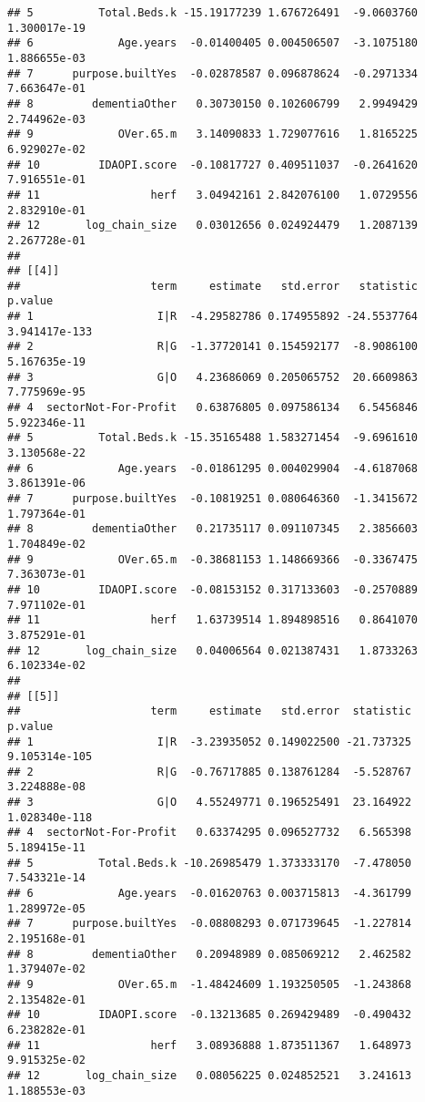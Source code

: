 \documentclass[]{article}
\begin{document}
\begin{verbatim}
## 5          Total.Beds.k -15.19177239 1.676726491  -9.0603760  1.300017e-19
## 6             Age.years  -0.01400405 0.004506507  -3.1075180  1.886655e-03
## 7      purpose.builtYes  -0.02878587 0.096878624  -0.2971334  7.663647e-01
## 8         dementiaOther   0.30730150 0.102606799   2.9949429  2.744962e-03
## 9             OVer.65.m   3.14090833 1.729077616   1.8165225  6.929027e-02
## 10         IDAOPI.score  -0.10817727 0.409511037  -0.2641620  7.916551e-01
## 11                 herf   3.04942161 2.842076100   1.0729556  2.832910e-01
## 12       log_chain_size   0.03012656 0.024924479   1.2087139  2.267728e-01
## 
## [[4]]
##                    term     estimate   std.error   statistic       p.value
## 1                   I|R  -4.29582786 0.174955892 -24.5537764 3.941417e-133
## 2                   R|G  -1.37720141 0.154592177  -8.9086100  5.167635e-19
## 3                   G|O   4.23686069 0.205065752  20.6609863  7.775969e-95
## 4  sectorNot-For-Profit   0.63876805 0.097586134   6.5456846  5.922346e-11
## 5          Total.Beds.k -15.35165488 1.583271454  -9.6961610  3.130568e-22
## 6             Age.years  -0.01861295 0.004029904  -4.6187068  3.861391e-06
## 7      purpose.builtYes  -0.10819251 0.080646360  -1.3415672  1.797364e-01
## 8         dementiaOther   0.21735117 0.091107345   2.3856603  1.704849e-02
## 9             OVer.65.m  -0.38681153 1.148669366  -0.3367475  7.363073e-01
## 10         IDAOPI.score  -0.08153152 0.317133603  -0.2570889  7.971102e-01
## 11                 herf   1.63739514 1.894898516   0.8641070  3.875291e-01
## 12       log_chain_size   0.04006564 0.021387431   1.8733263  6.102334e-02
## 
## [[5]]
##                    term     estimate   std.error  statistic       p.value
## 1                   I|R  -3.23935052 0.149022500 -21.737325 9.105314e-105
## 2                   R|G  -0.76717885 0.138761284  -5.528767  3.224888e-08
## 3                   G|O   4.55249771 0.196525491  23.164922 1.028340e-118
## 4  sectorNot-For-Profit   0.63374295 0.096527732   6.565398  5.189415e-11
## 5          Total.Beds.k -10.26985479 1.373333170  -7.478050  7.543321e-14
## 6             Age.years  -0.01620763 0.003715813  -4.361799  1.289972e-05
## 7      purpose.builtYes  -0.08808293 0.071739645  -1.227814  2.195168e-01
## 8         dementiaOther   0.20948989 0.085069212   2.462582  1.379407e-02
## 9             OVer.65.m  -1.48424609 1.193250505  -1.243868  2.135482e-01
## 10         IDAOPI.score  -0.13213685 0.269429489  -0.490432  6.238282e-01
## 11                 herf   3.08936888 1.873511367   1.648973  9.915325e-02
## 12       log_chain_size   0.08056225 0.024852521   3.241613  1.188553e-03
\end{verbatim}
\end{document}
